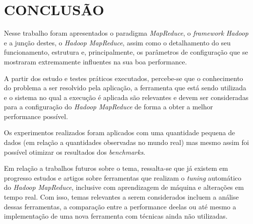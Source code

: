 \chapter{CONCLUSÃO} \label{cha:conclusao}

Nesse trabalho foram apresentados o paradigma \textit{MapReduce}, o \textit{\gls{framework}} \textit{Hadoop} e a junção destes, o \textit{Hadoop MapReduce}, assim como o detalhamento do seu funcionamento, estrutura e, principalmente, os parâmetros de configuração que se mostraram extremamente influentes na sua boa performance.

A partir dos estudo e testes práticos executados, percebe-se que o conhecimento do problema a ser resolvido pela aplicação, a ferramenta que está sendo utilizada e o sistema no qual a execução é aplicada são relevantes e devem ser consideradas para a configuração do \textit{Hadoop MapReduce} de forma a obter a melhor performance possível. 

Os experimentos realizados foram aplicados com uma quantidade pequena de dados (em relação a quantidades observadas no mundo real) mas mesmo assim foi possível otimizar os resultados dos \textit{\gls{benchmark}s}. 

Em relação a trabalhos futuros sobre o tema, ressalta-se que já existem em progresso estudos e artigos sobre ferramentas que realizam o \textit{tuning} automático do \textit{Hadoop MapReduce}, inclusive com aprendizagem de máquina e alterações em tempo real. Com isso, temas relevantes a serem considerados incluem a análise dessas ferramentas, a comparação entre  a performance deelas ou até mesmo a implementação de uma nova ferramenta com técnicas ainda não utilizadas.